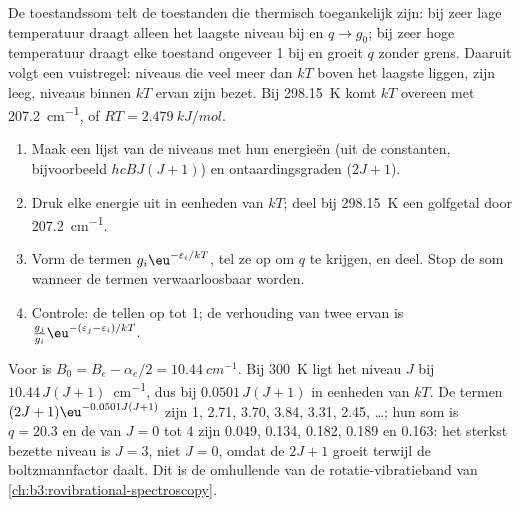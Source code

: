 De toestandssom telt de toestanden die thermisch toegankelijk zijn: bij
zeer lage temperatuur draagt alleen het laagste niveau bij en $q \to g_0$; bij zeer
hoge temperatuur draagt elke toestand ongeveer 1 bij en groeit $q$ zonder
grens. Daaruit volgt een vuistregel: niveaus die veel meer dan $kT$ boven
het laagste liggen, zijn leeg, niveaus binnen $kT$ ervan zijn bezet. Bij
\qty{298.15}{K} komt $kT$ overeen met
\qty{207.2}{cm^{-1}}, of $RT = \qty{2.479}{kJ/mol}$.

\begin{method}\label{met:b3:partition-functions:populations}
\begin{enumerate}
  \item Maak een lijst van de niveaus met hun energieën (uit de constanten,
        bijvoorbeeld $hcBJ(J+1)$) en ontaardingsgraden ($2J + 1$).
  \item Druk elke energie uit in eenheden van $kT$; deel bij
        \qty{298.15}{K} een golfgetal door \qty{207.2}{cm^{-1}}.
  \item Vorm de termen $g_i\eu^{-\varepsilon_i/kT}$, tel ze op om $q$ te krijgen, en deel.
        Stop de som wanneer de termen verwaarloosbaar worden.
  \item Controle: de  tellen op tot 1; de verhouding van twee
        ervan is
        $\frac{g_j}{g_i}\eu^{-(\varepsilon_j-\varepsilon_i)/kT}$.
\end{enumerate}
\end{method}

\begin{example}\label{ex:b3:partition-functions:hcl}
Voor  is $B_0 = B_e - \alpha_e/2 = \qty{10.44}{cm^{-1}}$. Bij
\qty{300}{K} ligt het niveau $J$
bij $10.44\,J(J+1)$~\unit{cm^{-1}}, dus bij $0.0501\,J(J+1)$ in eenheden van $kT$. De termen
$(2J+1)\eu^{-0.0501J(J+1)}$ zijn 1, 2.71, 3.70, 3.84, 3.31, 2.45, \dots; hun som is
$q = 20.3$ en de  van $J = 0$ tot 4 zijn 0.049, 0.134, 0.182, 0.189 en
0.163: het sterkst bezette niveau is $J = 3$, niet $J = 0$, omdat de
$2J + 1$ groeit terwijl de boltzmannfactor daalt. Dit is de omhullende van
de rotatie-vibratieband van \cref{ch:b3:rovibrational-spectroscopy}.
\end{example}

